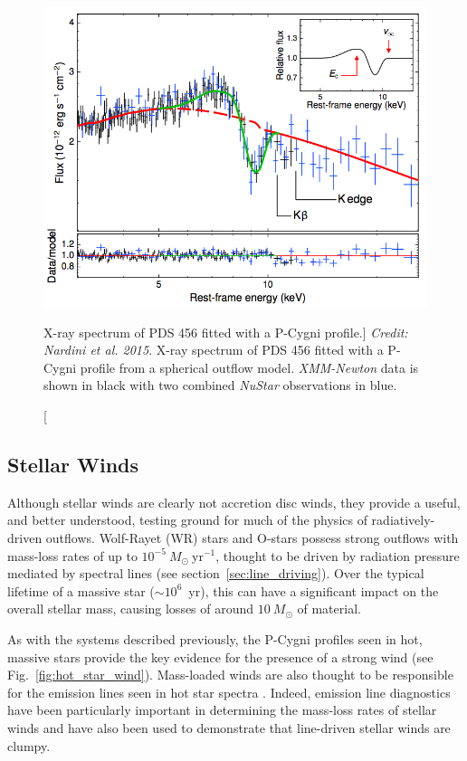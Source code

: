 \begin{figure}
\centering
\includegraphics[width=1.0\textwidth]{figures/02-outflows/nardini_pds456.png}
\caption
[X-ray spectrum of PDS 456 fitted with a P-Cygni profile.]
{
{\sl Credit: Nardini et al. 2015}. 
X-ray spectrum of PDS 456 fitted with a P-Cygni profile from a 
spherical outflow model. {\sl XMM-Newton} data is shown in black 
with two combined {\sl NuStar} observations in blue.
} 
\label{fig:nardini}
\end{figure}


\subsection{Stellar Winds}

\label{sec:stellar_winds}

Although stellar winds are clearly not accretion disc winds,
they provide a useful, and better understood, testing ground for much
of the physics of radiatively-driven outflows. 
Wolf-Rayet (WR) stars and O-stars possess strong outflows with mass-loss rates
of up to $10^{-5}~M_\odot~$yr$^{-1}$, thought to be driven by radiation pressure
mediated by spectral lines (see section~\ref{sec:line_driving}). 
Over the typical lifetime of a massive
star ($\sim10^6$~yr), this can have a significant impact on the overall stellar mass,
causing losses of around $10~M_\odot$ of material. 

As with the systems described previously, the P-Cygni profiles
seen in hot, massive stars provide the key evidence for the presence of
a strong wind (see Fig.~\ref{fig:hot_star_wind}). Mass-loaded
winds are also thought to be responsible for the emission lines 
seen in hot star spectra \citep[e.g.][]{pauldrach1994}. Indeed, emission
line diagnostics have been particularly important in determining
the mass-loss rates of stellar winds and have also been used to demonstrate 
that line-driven stellar winds are clumpy. 

